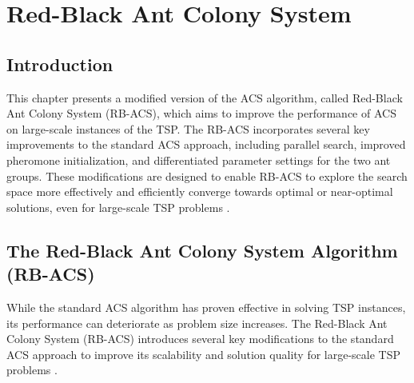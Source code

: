 
%

\chapter{Red-Black Ant Colony System}
\label{chapt:6}

\section{Introduction}

This chapter presents a modified version of the \Gls{ACS} algorithm, called Red-Black Ant Colony System (\Gls{RB-ACS}), which aims to improve the performance of \Gls{ACS} on large-scale instances of the \Gls{TSP}. The \Gls{RB-ACS} incorporates several key improvements to the standard \Gls{ACS} approach, including parallel search, improved pheromone initialization, and differentiated parameter settings for the two ant groups. These modifications are designed to enable \Gls{RB-ACS} to explore the search space more effectively and efficiently converge towards optimal or near-optimal solutions, even for large-scale \Gls{TSP} problems \cite{Hassan2013}.

\section{The Red-Black Ant Colony System Algorithm (\Gls{RB-ACS})}
While the standard \Gls{ACS} algorithm has proven effective in solving \Gls{TSP} instances, its performance can deteriorate as problem size increases. The Red-Black Ant Colony System (\Gls{RB-ACS}) introduces several key modifications to the standard \Gls{ACS} approach to improve its scalability and solution quality for large-scale \Gls{TSP} problems \cite{Hassan2013}.

